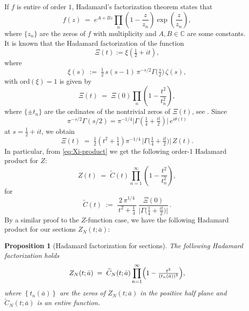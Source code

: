 \documentclass[12pt,reqno]{amsart}
\theoremstyle{plain}
\newtheorem{prop}{Proposition}[section]
\theoremstyle{definition}
\theoremstyle{remark}
\begin{document}
If \(f\) is entire of order \(1\), Hadamard’s factorization theorem states that 
\begin{equation}\label{eq:hadamard-order1}
f(z)\;=\;e^{A+Bz}\prod_{n}\!\left(1-\frac{z}{z_n}\right)\exp\!\left(\frac{z}{z_n}\right),
\end{equation}
where \(\{z_n\}\) are the zeros of \(f\) with multiplicity and \(A,B\in\mathbb{C}\) are some constants. It is known that the Hadamard factorization of the function 
\begin{equation}
\Xi(t):=\xi(\tfrac12+it), 
 \end{equation}
 where 
 \begin{equation}
\xi(s)\;:=\;\tfrac12\,s(s-1)\,\pi^{-s/2}\Gamma\!\big(\tfrac{s}{2}\big)\,\zeta(s),
\end{equation} 
with \(\mathrm{ord}(\xi)=1\) is given by 
\begin{equation}\label{eq:Xi-product}
\Xi(t)\;=\;\Xi(0)\prod_{n}\left(1-\frac{t^{2}}{t_n^{2}}\right),
\end{equation}
where \(\{\pm t_n\}\) are the ordinates of the nontrivial zeros of $\Xi(t)$, see \cite{E,T}. Since 
\begin{equation} 
\pi^{-s/2}\Gamma(s/2)=\pi^{-1/4}\big|\Gamma(\tfrac14+\tfrac{it}{2})\big|\,e^{i\theta(t)}
\end{equation}
 at \(s=\tfrac12+it\),  we obtain
\begin{equation}\label{eq:Xi-vs-Z}
\Xi(t)\;=\;\tfrac12\!\left(t^{2}+\tfrac14\right)\pi^{-1/4}\,\bigl|\Gamma\!\big(\tfrac14+\tfrac{it}{2}\big)\bigr|\,Z(t).
\end{equation}
In particular, from \eqref{eq:Xi-product} we get the following order-1 Hadamard product for \(Z\):
\begin{equation}\label{eq:Z-product}
Z(t)\;=\; \widetilde{C}(t)\prod_{n=1}^{\infty} \left(1-\frac{t^{2}}{t_n^{2}}\right),
\end{equation}
for 
\begin{equation}
\label{eq:C-function}
\widetilde{C}(t)\;:=\;\frac{2\,\pi^{1/4}}{\,t^{2}+\tfrac14\,}\,
\frac{\Xi(0)}{\bigl|\Gamma\!\big(\tfrac14+\tfrac{it}{2}\big)\bigr|}\,.
\end{equation}
By a similar proof to the $Z$-function case, we have the following Hadamard product for our sections $Z_N(t; \bar{a})$:


\begin{prop}[Hadamard factorization for sections]
\label{thm:local-factorization}
The following Hadamard factorization holds
\begin{equation}\label{eq:Hadamard}
Z_N(t;\bar a) \;=\; \widetilde{C}_N(t; \bar a)\prod_{n=1}^\infty \Bigl(1-\tfrac{t^2}{(t_n(\bar a))^2}\Bigr),
\end{equation}
where $\left \{ t_n (\bar{a}) \right \}$ are the zeros of $Z_N(t; \bar{a})$ in the positive half plane and $\widetilde{C}_N(t; \bar a)$ is an entire function. 
\end{prop}
\end{document}

